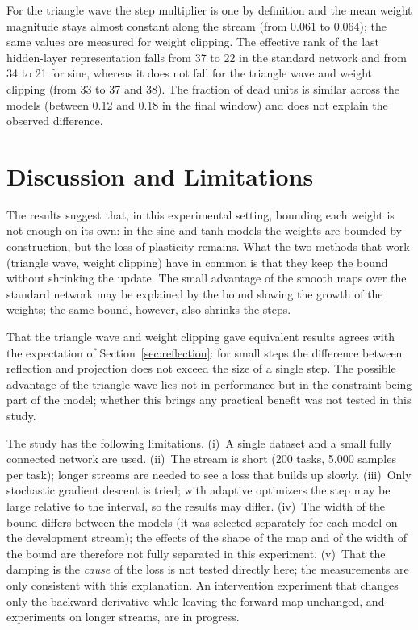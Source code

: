\documentclass[conference,a4paper]{IEEEtran}
\begin{document}
For the triangle wave the step multiplier is one by definition and the mean weight magnitude stays almost
constant along the stream (from 0.061 to 0.064); the same values are measured for weight clipping. The
effective rank of the last hidden-layer representation falls from 37 to 22 in the standard network and from 34
to 21 for sine, whereas it does not fall for the triangle wave and weight clipping (from 33 to 37 and 38). The
fraction of dead units is similar across the models (between 0.12 and 0.18 in the final window) and does
not explain the observed difference.

\section{Discussion and Limitations}

The results suggest that, in this experimental setting, bounding each weight is not enough on its own: in the sine and tanh models the weights are bounded by construction, but the loss of plasticity remains. What the two methods that work (triangle wave, weight clipping) have in common is that
they keep the bound without shrinking the update. The small advantage of the smooth maps over the standard
network may be explained by the bound slowing the growth of the weights; the same bound, however, also shrinks
the steps.

That the triangle wave and weight clipping gave equivalent results agrees with the expectation of
Section~\ref{sec:reflection}: for small steps the difference between reflection and projection does not exceed
the size of a single step. The possible advantage of the triangle wave lies not in performance but in the
constraint being part of the model; whether this brings any practical benefit was not tested in this study.

The study has the following limitations. (i)~A single dataset and a small fully connected network are used.
(ii)~The stream is short (200 tasks, 5,000 samples per task); longer streams are needed to see a loss that builds up slowly. (iii)~Only stochastic gradient descent is tried; with adaptive optimizers the step
may be large relative to the interval, so the results may differ. (iv)~The width of the bound differs between
the models (it was selected separately for each model on the development stream); the effects of the shape of
the map and of the width of the bound are therefore not fully separated in this experiment. (v)~That the damping is the \emph{cause} of the loss is not tested directly here; the
measurements are only consistent with this explanation. An intervention experiment that changes only the
backward derivative while leaving the forward map unchanged, and experiments on longer streams, are in progress.
\end{document}
